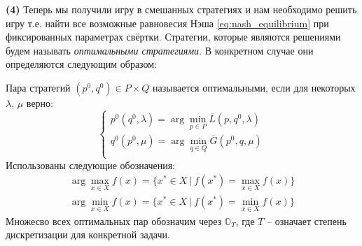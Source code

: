 \textbf{(4)}
Теперь мы получили игру в смешанных стратегиях и нам необходимо решить игру
т.е. найти все возможные равновесия Нэша \eqref{eq:nash_equilibrium}
при фиксированных параметрах свёртки. 
Стратегии, которые являются решениями будем называть 
\textit{оптимальными стратегиями}. В конкретном случае они определяются
следующим образом:

\begin{Def}	
	Пара стратегий $(p^0, q^0) \in P \times Q$
	называется оптимальными, если для некоторых 
	$\lambda$, $\mu$ верно:
	\begin{equation}
		\begin{cases} 
			p^0(q^0, \lambda) = 
			\arg \min \limits_{p \in P} \overline L(p, q^0, \lambda) \\ 
			q^0(p^0, \mu) = 
			\arg \min \limits_{q \in Q} \overline G(p^0, q, \mu) \\
		\end{cases}
	\label{def:optimal_strategy}
	\end{equation}
	Использованы следующие обозначения:
	\begin{gather*}
		\arg \max \limits_{x \in X} f(x) = 
		\{ x^* \in X \: | \: f(x^*) = \max \limits_{x \in X} f(x)\}
		\\
		\arg \min \limits_{x \in X} f(x) = 
		\{ x^* \in X \: | \: f(x^*) = \min \limits_{x \in X} f(x)\}
	\end{gather*}
	Множесво всех оптимальных пар обозначим через $\mathbb{O}_T$,
	где $T$ -- означает степень дискретизации для конкретной задачи.
\end{Def}



